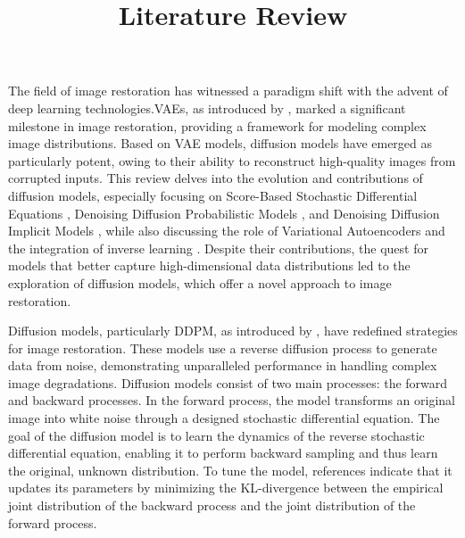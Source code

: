 
\begin{survey}
\label{cha:survey}

\title{Literature Review}
\maketitle



The field of image restoration has witnessed a paradigm shift with the advent of deep learning technologies.VAEs, as introduced by \cite{vae_model}, marked a significant milestone in image restoration, providing a framework for modeling complex image distributions. Based on VAE models, diffusion models have emerged as particularly potent, owing to their ability to reconstruct high-quality images from corrupted inputs. This review delves into the evolution and contributions of diffusion models, especially focusing on Score-Based Stochastic Differential Equations \cite{score_based_SDE,song_2}, Denoising Diffusion Probabilistic Models \cite{DDPM}, and Denoising Diffusion Implicit Models \cite{DDIM}, while also discussing the role of Variational Autoencoders \cite{VAE_diffusion,Consistency} and the integration of inverse learning \cite{MCG,Inverse,pseudoinverse,song2023pseudoinverse}.   Despite their contributions, the quest for models that better capture high-dimensional data distributions led to the exploration of diffusion models, which offer a novel approach to image restoration.       

Diffusion models, particularly DDPM, as introduced by \cite{DDPM}, have redefined strategies for image restoration. These models use a reverse diffusion process to generate data from noise, demonstrating unparalleled performance in handling complex image degradations. Diffusion models consist of two main processes: the forward and backward processes. In the forward process, the model transforms an original image into white noise through a designed stochastic differential equation. The goal of the diffusion model is to learn the dynamics of the reverse stochastic differential equation, enabling it to perform backward sampling and thus learn the original, unknown distribution. To tune the model, references \cite{DDPM, DDIM} indicate that it updates its parameters by minimizing the KL-divergence between the empirical joint distribution of the backward process and the joint distribution of the forward process.      



\end{survey}
